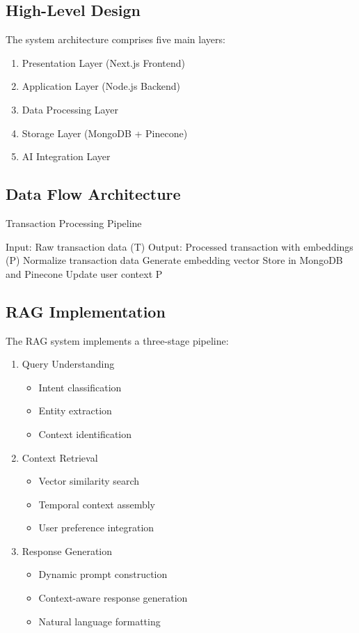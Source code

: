 \documentclass[conference]{IEEEtran}
\begin{document}
\subsection{High-Level Design}
The system architecture comprises five main layers:
\begin{enumerate}
\item Presentation Layer (Next.js Frontend)
\item Application Layer (Node.js Backend)
\item Data Processing Layer
\item Storage Layer (MongoDB + Pinecone)
\item AI Integration Layer
\end{enumerate}

\subsection{Data Flow Architecture}
\begin{algorithm}
\caption{Transaction Processing Pipeline}
\begin{algorithmic}[1]
\STATE Input: Raw transaction data (T)
\STATE Output: Processed transaction with embeddings (P)
\STATE Normalize transaction data
\STATE Generate embedding vector
\STATE Store in MongoDB and Pinecone
\STATE Update user context
\ENDFOR
\RETURN P
\end{algorithmic}
\end{algorithm}

\subsection{RAG Implementation}
The RAG system implements a three-stage pipeline:
\begin{enumerate}
\item Query Understanding
\begin{itemize}
\item Intent classification
\item Entity extraction
\item Context identification
\end{itemize}

\item Context Retrieval
\begin{itemize}
\item Vector similarity search
\item Temporal context assembly
\item User preference integration
\end{itemize}

\item Response Generation
\begin{itemize}
\item Dynamic prompt construction
\item Context-aware response generation
\item Natural language formatting
\end{itemize}
\end{enumerate}
\end{document}
